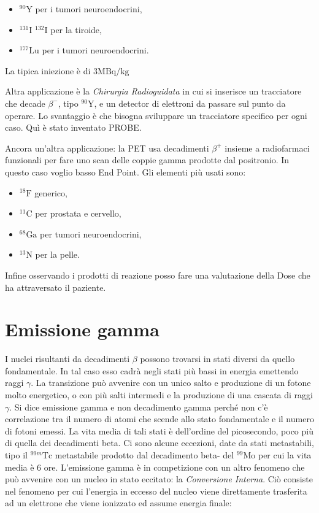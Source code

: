 \begin{itemize}
\item $^{90}\text{Y}$ per i tumori neuroendocrini,
\item $^{131}\text{I}$ $^{132}\text{I}$ per la tiroide,
\item $^{177}\text{Lu}$ per i tumori neuroendocrini.
\end{itemize}

La tipica iniezione è di $3 \text{MBq/kg}$

Altra applicazione è la \emph{Chirurgia Radioguidata} in cui si inserisce un tracciatore che decade $\beta^-$, tipo $^{90}\text{Y}$, e un detector di elettroni da passare sul punto da operare. Lo svantaggio è che bisogna sviluppare un tracciatore specifico per ogni caso. Quì è stato inventato PROBE.

Ancora un'altra applicazione: la PET usa decadimenti $\beta^+$ insieme a radiofarmaci funzionali per fare uno scan delle coppie gamma prodotte dal positronio. In questo caso voglio basso End Point. Gli elementi più usati sono:

\begin{itemize}
\item $^{18}\text{F}$ generico,
\item $^{11}\text{C}$ per prostata e cervello,
\item $^{68}\text{Ga}$ per tumori neuroendocrini,
\item $^{13}\text{N}$ per la pelle.
\end{itemize}

Infine osservando i prodotti di reazione posso fare una valutazione della Dose che ha attraversato il paziente.

\section{Emissione gamma}

I nuclei risultanti da decadimenti $\beta$ possono trovarsi in stati diversi da quello fondamentale. In tal caso esso cadrà negli stati più bassi in energia emettendo raggi $\gamma$. La transizione può avvenire con un unico salto e produzione di un fotone molto energetico, o con più salti intermedi e la produzione di una cascata di raggi $\gamma$. Si dice emissione gamma e non decadimento gamma perché non c'è correlazione tra il numero di atomi che scende allo stato fondamentale e il numero di fotoni emessi. La vita media di tali stati è dell'ordine del picosecondo, poco più di quella dei decadimenti beta. Ci sono alcune eccezioni, date da stati metastabili, tipo il $^{99m}\text{Tc}$ metastabile prodotto dal decadimento beta- del $^{99}\text{Mo}$ per cui la vita media è 6 ore.
L'emissione gamma è in competizione con un altro fenomeno che può avvenire con un nucleo in stato eccitato: la \emph{Conversione Interna}. Ciò consiste nel fenomeno per cui l'energia in eccesso del nucleo viene direttamente trasferita ad un elettrone che viene ionizzato ed assume energia finale:

